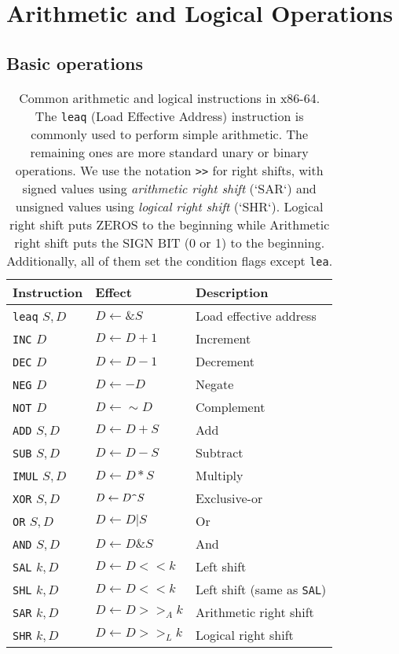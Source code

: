 \section{Arithmetic and Logical Operations}
\subsection{Basic operations}
\begin{table}[h]
    \centering
    \small
    \renewcommand{\arraystretch}{1.2}
    \caption{Common arithmetic and logical instructions in x86-64. The \texttt{leaq} 
    (Load Effective Address) instruction is commonly used to perform simple arithmetic. 
    The remaining ones are more standard unary or binary operations. We use the notation 
    \texttt{>>} for right shifts, with signed values using \textit{arithmetic right shift} 
    (`SAR`) and unsigned values using \textit{logical right shift} (`SHR`). Logical right 
    shift puts ZEROS to the beginning while Arithmetic right shift puts the SIGN BIT (0 or 1)
     to the beginning. Additionally, all of them set the condition flags except \texttt{lea}.}
    \label{basic-arith}
    \begin{tabular}{l l l}
        \toprule
        \textbf{Instruction} & \textbf{Effect} & \textbf{Description} \\
        \midrule
        \texttt{leaq} $S, D$  & $D \leftarrow \&S$ & Load effective address \\
        \midrule
        \texttt{INC} $D$  & $D \leftarrow D+1$ & Increment \\
        \texttt{DEC} $D$  & $D \leftarrow D-1$ & Decrement \\
        \texttt{NEG} $D$  & $D \leftarrow -D$ & Negate \\
        \texttt{NOT} $D$  & $D \leftarrow \sim D$ & Complement \\
        \midrule
        \texttt{ADD} $S, D$  & $D \leftarrow D + S$ & Add \\
        \texttt{SUB} $S, D$  & $D \leftarrow D - S$ & Subtract \\
        \texttt{IMUL} $S, D$  & $D \leftarrow D * S$ & Multiply \\
        \texttt{XOR} $S, D$  & $D \leftarrow D  \texttt{\string^} S$ & Exclusive-or \\
        \texttt{OR} $S, D$  & $D \leftarrow D | S$ & Or \\
        \texttt{AND} $S, D$  & $D \leftarrow D \& S$ & And \\
        \midrule
        \texttt{SAL} $k, D$  & $D \leftarrow D << k$ & Left shift \\
        \texttt{SHL} $k, D$  & $D \leftarrow D << k$ & Left shift (same as \texttt{SAL}) \\
        \texttt{SAR} $k, D$  & $D \leftarrow D >>_A k$ & Arithmetic right shift \\
        \texttt{SHR} $k, D$  & $D \leftarrow D >>_L k$ & Logical right shift \\
        \bottomrule
    \end{tabular}
\end{table}


